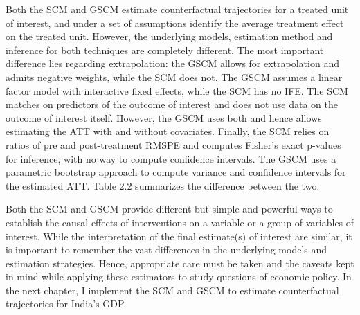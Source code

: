 \documentclass[12pt,nobind, a4paper]{reedthesis}
\begin{document}
 Both the SCM and GSCM estimate counterfactual trajectories for a treated unit of interest, and under a set of assumptions identify the average treatment effect on the treated unit. However, the underlying models, estimation method and inference for both techniques are completely different. The most important difference lies regarding extrapolation: the GSCM allows for extrapolation and admits negative weights, while the SCM does not. The GSCM assumes a linear factor model with interactive fixed effects, while the SCM has no IFE. The SCM matches on predictors of the outcome of interest and does not use data on the outcome of interest itself. However, the GSCM uses both and hence allows estimating the ATT with and without covariates. Finally, the SCM relies on ratios of pre and post-treatment RMSPE and computes Fisher's exact p-values for inference, with no way to compute confidence intervals. The GSCM uses a parametric bootstrap approach to compute variance and confidence intervals for the estimated ATT. Table 2.2 summarizes the difference between the two.
 \begin{table}[h!!]
 \centering
 \caption{Differences between the SCM and GSCM Estimators}
 \end{table}
 \linebreak

 Both the SCM and GSCM provide different but simple and powerful ways to establish the causal effects of interventions on a variable or a group of variables of interest. While the interpretation of the final estimate(s) of interest are similar, it is important to remember the vast differences in the underlying models and estimation strategies. Hence, appropriate care must be taken and the caveats kept in mind while applying these estimators to study questions of economic policy. In the next chapter, I implement the SCM and GSCM to estimate counterfactual trajectories for India's GDP.
\end{document}
